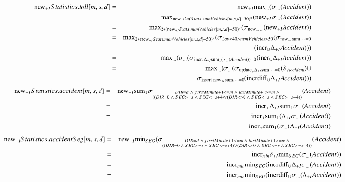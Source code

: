 \begin{eqnarray*}
\mathrm{new}_{+I} Statistics.toll[m,s,d] &=& \mathrm{new}_{+I} \mathrm{max}_{\dots} (\sigma_{\dots} (Accident))\\
&=& \mathrm{max}_{\mathrm{new}_{+I} 2*(Stats.numVehicles[m,s,d] - 50)^2} (\mathrm{new}_{+I} \sigma_{\dots} (Accident))\\
&=& \mathrm{max}_{2*(\mathrm{new}_{+I} Stats.numVehicles[m,s,d] -50)^2} (\sigma_{ \mathrm{new}_{+I} \dots } (\mathrm{new}_{+I} Accident))\\
&=& \mathrm{max}_{2*(\mathrm{new}_{+I} Stats.numVehicles[m,s,d] -50)^2} (\sigma_{Lav<40\wedge numVehicles>50} (\sigma_{ \mathrm{new}_{+I} \mathrm{sum}_{1} \dots = 0 } \\&&\quad(\mathrm{incr}_{\cup} \Delta_{+I} Accident)))\\
&=& \mathrm{max}_{\dots} (\sigma_{\dots} (\sigma_{\mathrm{incr}_{+} \Delta_{+I} \mathrm{sum}_{1} (\sigma_{\dots} (Accident)) = 0} (\mathrm{incr}_{\cup} \Delta_{+I} Accident))\\
&=& \mathrm{max}_{\dots} (\sigma_{\dots} (\sigma_{\mathrm{update}_{+} \Delta_{+I} \mathrm{sum}_{1}\dots = 0} (S_{Accident}) \cup \\ &&\quad \sigma_{\mathrm{insert} \;\mathrm{new}_{+I} \mathrm{sum}_{1} \dots = 0}(\mathrm{incrdiff}_{\cup} \Delta_{+I} Accident)))
\end{eqnarray*}
\begin{eqnarray*}
\mathrm{new}_{+I} Statistics.accident[m, s, d] &=& 
\mathrm{new}_{+I} \mathrm{sum}_{1} \sigma_{\substack{DIR = d \;\wedge\; firstMinute +1 <= m\; \wedge\; lastMinute +1 >= m \;\wedge\\ ((DIR = 0 \;\wedge\; SEG  >= s \;\wedge\; SEG <= s +4 ) \vee (DIR <> 0 \;\wedge\; SEG <= s \;\wedge\; SEG >= s-4))}} (Accident)\\
&=& \mathrm{incr}_{+} \Delta_{+I} \mathrm{sum}_{1} \sigma_{\dots} (Accident)\\
&=& \mathrm{incr}_{+} \mathrm{sum}_{1} (\Delta_{+I} \sigma_{\dots} (Accident))\\
&=& \mathrm{incr}_{+} \mathrm{sum}_{1} (\sigma_{\dots} (\Delta_{+I} (Accident))
\end{eqnarray*}
\begin{eqnarray*}
\mathrm{new}_{+I} Statistics.accidentSeg[m, s, d] &=& \mathrm{new}_{+I} \mathrm{min}_{SEG} (\sigma_{\substack{DIR = d \;\wedge\; firstMinute +1 <= m\; \wedge\; lastMinute +1 >= m \;\wedge\\ ((DIR = 0 \;\wedge\; SEG  >= s \;\wedge\; SEG <= s +4 ) \vee (DIR <> 0 \;\wedge\; SEG <= s \;\wedge\; SEG >= s-4))}} (Accident) \\
&=& \mathrm{incr}_{min} \delta_{+I} \mathrm{min}_{SEG} (\sigma_{\dots} (Accident)) \\
&=& \mathrm{incr}_{min} \mathrm{min}_{SEG} (\mathrm{incrdiff}_{\cup} \Delta_{+I} \sigma_{\dots} (Accident))\\
&=& \mathrm{incr}_{min} \mathrm{min}_{SEG} (\mathrm{incrdiff}_{\cup} \sigma_{\dots} (\Delta_{+I} Accident))
\end{eqnarray*}
